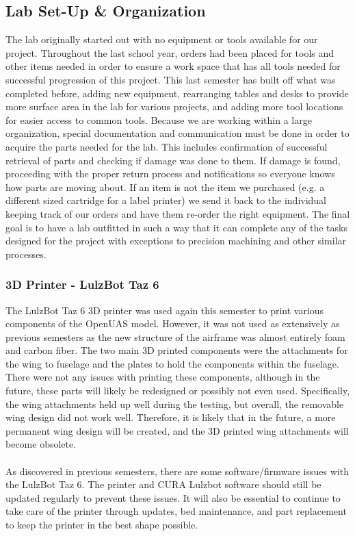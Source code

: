 \documentclass{article}
\begin{document}
\subsection{Lab Set-Up \& Organization}
\noindent The lab originally started out with no equipment or tools available for our project. Throughout the last school year, orders had been placed for tools and other items needed in order to ensure a work space that has all tools needed for successful progression of this project. This last semester has built off what was completed before, adding new equipment, rearranging tables and desks to provide more surface area in the lab for various projects, and adding more tool locations for easier access to common tools.  Because we are working within a large organization, special documentation and communication must be done in order to acquire the parts needed for the lab. This includes confirmation of successful retrieval of parts and checking if damage was done to them. If damage is found, proceeding with the proper return process and notifications so everyone knows how parts are moving about. If an item is not the item we purchased (e.g. a different sized cartridge for a label printer) we send it back to the individual keeping track of our orders and have them re-order the right equipment. The final goal is to have a lab outfitted in such a way that it can complete any of the tasks designed for the project with exceptions to precision machining and other similar processes.\\


\subsubsection{3D Printer - LulzBot Taz 6}
The LulzBot Taz 6 3D printer was used again this semester to print various components of the OpenUAS model. However, it was not used as extensively as previous semesters as the new structure of the airframe was almost entirely foam and carbon fiber. The two main 3D printed components were the attachments for the wing to fuselage and the plates to hold the components within the fuselage. There were not any issues with printing these components, although in the future, these parts will likely be redesigned or possibly not even used. Specifically, the wing attachments held up well during the testing, but overall, the removable wing design did not work well. Therefore, it is likely that in the future, a more permanent wing design will be created, and the 3D printed wing attachments will become obsolete.\\\\
As discovered in previous semesters, there are some software/firmware issues with the LulzBot Taz 6. The printer and CURA Lulzbot software should still be updated regularly to prevent these issues. It will also be essential to continue to take care of the printer through updates, bed maintenance, and part replacement to keep the printer in the best shape possible. 
\end{document}
